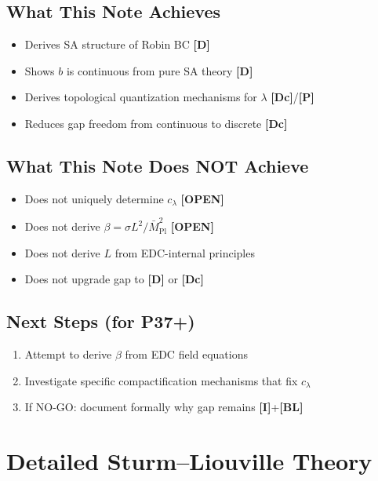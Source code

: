 \documentclass[11pt,a4paper]{article}
\newcommand{\Mpl}{\bar{M}_{\mathrm{Pl}}}
\newcommand{\tagD}{\textbf{[D]}}
\newcommand{\tagDc}{\textbf{[Dc]}}
\newcommand{\tagI}{\textbf{[I]}}
\newcommand{\tagBL}{\textbf{[BL]}}
\newcommand{\tagP}{\textbf{[P]}}
\newcommand{\tagOPEN}{\textbf{[OPEN]}}
\theoremstyle{definition}
\theoremstyle{plain}
\theoremstyle{remark}
\begin{document}
\subsection{What This Note Achieves}

\begin{itemize}
\item Derives SA structure of Robin BC \tagD{}
\item Shows $b$ is continuous from pure SA theory \tagD{}
\item Derives topological quantization mechanisms for $\lambda$ \tagDc{}/\tagP{}
\item Reduces gap freedom from continuous to discrete \tagDc{}
\end{itemize}

\subsection{What This Note Does NOT Achieve}

\begin{itemize}
\item Does not uniquely determine $c_\lambda$ \tagOPEN{}
\item Does not derive $\beta = \sigma L^2/\Mpl^2$ \tagOPEN{}
\item Does not derive $L$ from EDC-internal principles
\item Does not upgrade gap to \tagD{} or \tagDc{}
\end{itemize}

\subsection{Next Steps (for P37+)}

\begin{enumerate}
\item Attempt to derive $\beta$ from EDC field equations
\item Investigate specific compactification mechanisms that fix $c_\lambda$
\item If NO-GO: document formally why gap remains \tagI{}+\tagBL{}
\end{enumerate}

\appendix

\section{Detailed Sturm--Liouville Theory}
\label{app:SL}
\end{document}
